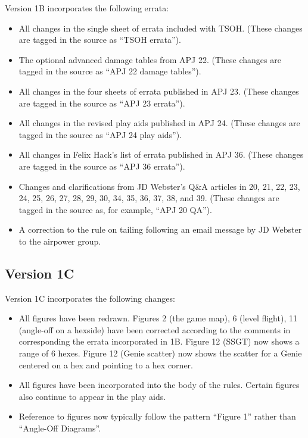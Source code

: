 \documentclass[10pt]{article}
\begin{document}
Version 1B incorporates the following errata:

\begin{itemize}
    \item All changes in the single sheet of errata included with TSOH. (These changes are tagged in the source as “TSOH errata”).
    \item The optional advanced damage tables from APJ 22. (These changes are tagged in the source as “APJ 22 damage tables”).
    \item All changes in the four sheets of errata published in APJ 23. (These changes are tagged in the source as “APJ 23 errata”).
    \item All changes in the revised play aids published in APJ 24. (These changes are tagged in the source as “APJ 24 play aids”).
    \item All changes in Felix Hack’s list of errata published in APJ 36. (These changes are tagged in the source as “APJ 36 errata”).
    \item Changes and clarifications from JD Webster’s Q\&A articles in {\APJ} 20, 21, 22, 23, 24, 25, 26, 27, 28, 29, 30, 34, 35, 36, 37, 38, and 39. (These changes are tagged in the source as, for example, “APJ 20 QA”).
    \item A correction to the rule on tailing following an email message by JD Webster to the airpower group.
    
\end{itemize}

\subsection{Version 1C}

Version 1C incorporates the following changes:

\begin{itemize}
    \item All figures have been redrawn. Figures 2 (the game map), 6 (level flight), 11 (angle-off on a hexside) have been corrected according to the comments in corresponding the errata incorporated in 1B. Figure 12 (SSGT) now shows a range of 6 hexes. Figure 12 (Genie scatter) now shows the scatter for a Genie centered on a hex and pointing to a hex corner.
    \item All figures have been incorporated into the body of the rules. Certain figures also continue to appear in the play aids.
    \item Reference to figures now typically follow the pattern “Figure 1” rather than “Angle-Off Diagrams”.
\end{itemize}
\end{document}
